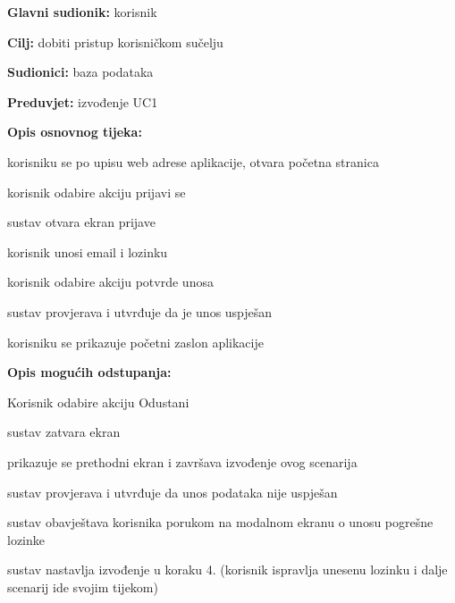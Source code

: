                     \noindent {}
					\begin{packed_item}
	
						\item \textbf{Glavni sudionik: }korisnik
						\item  \textbf{Cilj: }dobiti pristup korisničkom sučelju
						\item  \textbf{Sudionici: }baza podataka
						\item  \textbf{Preduvjet: } izvođenje UC1
						\item  \textbf{Opis osnovnog tijeka:}
						
						\item[] \begin{packed_enum}
							\item korisniku se po upisu web adrese aplikacije, otvara početna stranica
							\item korisnik odabire akciju prijavi se
							\item sustav otvara ekran prijave
							\item korisnik unosi email i lozinku
							\item korisnik odabire akciju potvrde unosa
							\item sustav provjerava i utvrđuje da je unos uspješan
							\item korisniku se prikazuje početni zaslon aplikacije

						\end{packed_enum}
						
						\item  \textbf{Opis mogućih odstupanja:}
						
						\item[] \begin{packed_item}
							\item[5.a] Korisnik odabire akciju Odustani
							\item[] 
							\begin{packed_enum} 
								\item sustav zatvara ekran
								\item prikazuje se prethodni ekran i završava izvođenje ovog scenarija
							\end{packed_enum}
							\item[6.a]  sustav provjerava i utvrđuje da unos podataka nije uspješan
							\item[] 
							\begin{packed_enum}
								\item sustav obavještava korisnika porukom na modalnom ekranu o unosu pogrešne lozinke
								\item sustav nastavlja izvođenje u koraku 4. (korisnik ispravlja unesenu lozinku i dalje scenarij ide svojim tijekom)
							\end{packed_enum}
							
						\end{packed_item}
					\end{packed_item}

